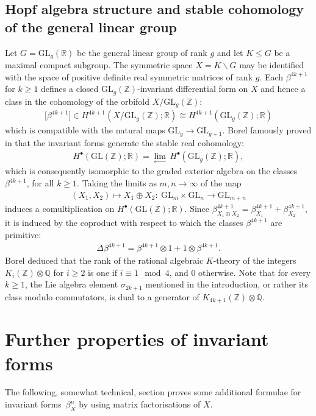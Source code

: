 \documentclass[pdftex]{sigma}%
\numberwithin{equation}{section}
\newcommand{\Z}{\mathbb Z}
\newcommand{\Q}{\mathbb Q}
\newcommand{\R}{\mathbb R}
\newcommand{\GL}{\mathrm{GL}}
\newcommand{\0}{\color{blue}{\mathsf{0}}}
\begin{document}
\subsection{Hopf algebra structure and stable cohomology of the general linear group}
Let $G= \GL_g(\R)$ be the general linear group of rank $g$ and let $K\leq G$ be a maximal compact subgroup. The symmetric space $X=K\backslash G$ may be identified with the space of positive definite real symmetric matrices of rank $g$. Each $\beta^{4k+1}$ for $k\geq 1$ defines a closed $\GL_g(\Z)$-invariant differential form on $X$ and hence
a class in the cohomology of the orbifold $X / \GL_g(\Z)$:
\begin{gather*}
 \big[\beta^{4k+1}\big] \in H^{4k+1} (X / \GL_g(\Z);\R) \cong H^{4k+1}(\GL_g(\Z);\R)
 \end{gather*}
which is compatible with the natural maps $\GL_g \rightarrow \GL_{g+1}$. Borel famously proved in \cite{Borel} that the invariant forms generate the stable real cohomology:
\begin{gather*}
 H^{\bullet}(\GL(\Z);\R) = \underset{\leftarrow}{\lim} \, H^{\bullet}(\GL_g(\Z);\R),
 \end{gather*}
which is consequently isomorphic to the graded exterior algebra on the classes $\beta^{4k+1}$, for all $k\geq 1$.
Taking the limits as $m,n \rightarrow \infty$ of the map
\begin{gather*}
(X_1, X_2) \mapsto X_1 \oplus X_2\colon\ \mathrm{GL}_{m} \times \mathrm{GL}_n \rightarrow \mathrm{GL}_{m+n}
\end{gather*}
 induces a comultiplication on $H^{\bullet}(\GL(\Z);\R)$.
Since $\beta^{4k+1}_{X_1\oplus X_2} = \beta^{4k+1}_{X_1} + \beta^{4k+1}_{X_2}$, it is induced by the coproduct with respect to which the classes $\beta^{4k+1}$ are primitive:
\begin{gather} \label{betaprimitive} \Delta \beta^{4k+1} = \beta^{4k+1} \otimes 1 + 1 \otimes \beta^{4k+1} .
\end{gather}
Borel deduced that the rank of the rational algebraic $K$-theory of the integers $K_i(\Z)\otimes \Q$ for $i\geq 2$ is one if $i\equiv 1 \mod 4$, and $0$ otherwise. Note that for every $k\geq 1$, the Lie algebra element $\sigma_{2k+1}$ mentioned in the introduction, or rather its class modulo commutators, is dual to a generator of $K_{4k+1}(\Z) \otimes \Q$.



\section{Further properties of invariant forms}
{\sloppy
The following, somewhat technical, section proves some additional formulae for invariant forms~$\beta^n_X$ by using matrix factorisations of $X$.

}
\end{document}

